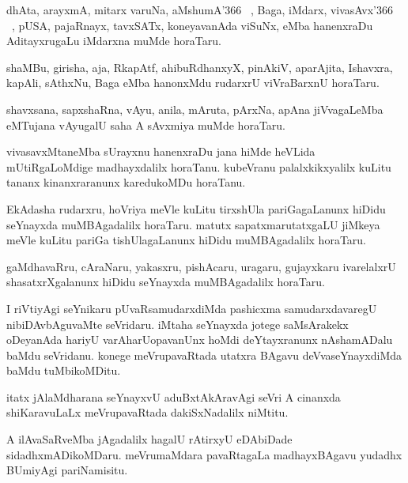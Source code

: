 \documentclass{article}
\begin{document}
\begin{mn}%
dhAta, arayxmA, mitarx varuNa, aMshumA\char'366 ~, Baga, iMdarx, vivasAvx\char'366 ~, pUSA, 
pajaRnayx, tavxSATx, koneyavanAda viSuNx, eMba hanenxraDu AditayxrugaLu iMdarxna muMde 
horaTaru.
\end{mn}

\begin{mn}%
shaMBu, girisha, aja, RkapAtf, ahibuRdhanxyX, pinAkiV, aparAjita, Ishavxra, kapAli, sAthxNu, 
Baga eMba hanonxMdu rudarxrU viVraBarxnU horaTaru.
\end{mn}

\begin{mn}%
shavxsana, sapxshaRna, vAyu, anila, mAruta, pArxNa, apAna jiVvagaLeMba eMTujana vAyugalU 
saha A sAvxmiya muMde horaTaru.
\end{mn}

\begin{mn}%
vivasavxMtaneMba sUrayxnu hanenxraDu jana hiMde heVLida mUtiRgaLoMdige madhayxdalilx 
horaTanu. kubeVranu palalxkikxyalilx kuLitu tananx kinanxraranunx karedukoMDu horaTanu.
\end{mn}

\begin{mn}%
EkAdasha rudarxru, hoVriya meVle kuLitu tirxshUla pariGagaLanunx hiDidu seYnayxda 
muMBAgadalilx horaTaru. matutx sapatxmarutatxgaLU jiMkeya meVle kuLitu pariGa 
tishUlagaLanunx hiDidu muMBAgadalilx horaTaru.
\end{mn}

\begin{mn}%
gaMdhavaRru, cAraNaru, yakasxru, pishAcaru, uragaru, gujayxkaru ivarelalxrU 
shasatxrXgalanunx hiDidu seYnayxda muMBAgadalilx horaTaru.
\end{mn}

\begin{mn}%
I riVtiyAgi seYnikaru pUvaRsamudarxdiMda pashicxma samudarxdavaregU nibiDAvbAguvaMte 
seVridaru. iMtaha seYnayxda jotege saMsArakekx oDeyanAda hariyU varAharUopavanUnx hoMdi 
deYtayxranunx nAshamADalu baMdu seVridanu. konege meVrupavaRtada utatxra BAgavu 
deVvaseYnayxdiMda baMdu tuMbikoMDitu.
\end{mn}

\begin{mn}%
itatx jAlaMdharana seYnayxvU aduBxtAkAravAgi seVri A cinanxda shiKaravuLaLx meVrupavaRtada 
dakiSxNadalilx niMtitu.
\end{mn}

\begin{mn}%
A ilAvaSaRveMba jAgadalilx hagalU rAtirxyU eDAbiDade sidadhxmADikoMDaru. meVrumaMdara 
pavaRtagaLa madhayxBAgavu yudadhx BUmiyAgi pariNamisitu.
\end{mn}
\end{document}
